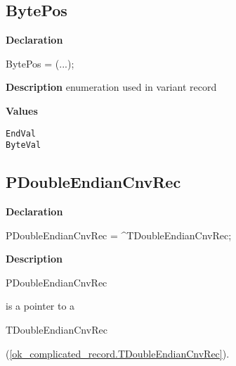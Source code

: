 \documentclass{report}
\begin{document}
\subsection*{BytePos}
\begin{list}{}{
\setlength{\itemindent}{0cm}
\setlength{\listparindent}{0cm}
\setlength{\leftmargin}{\evensidemargin}
\addtolength{\leftmargin}{\tmplength}
\settowidth{\labelsep}{X}
\addtolength{\leftmargin}{\labelsep}
\setlength{\labelwidth}{\tmplength}
}
\begin{flushleft}
\item[\textbf{Declaration}\hfill]
\begin{ttfamily}
BytePos = (...);\end{ttfamily}


\end{flushleft}
\par
\item[\textbf{Description}]
enumeration used in variant record\item[\textbf{Values}]
\begin{description}
\item[\texttt{EndVal}]  
\item[\texttt{ByteVal}]  
\end{description}


\end{list}
\subsection*{PDoubleEndianCnvRec}
\begin{list}{}{
\setlength{\itemindent}{0cm}
\setlength{\listparindent}{0cm}
\setlength{\leftmargin}{\evensidemargin}
\addtolength{\leftmargin}{\tmplength}
\settowidth{\labelsep}{X}
\addtolength{\leftmargin}{\labelsep}
\setlength{\labelwidth}{\tmplength}
}
\begin{flushleft}
\item[\textbf{Declaration}\hfill]
\begin{ttfamily}
PDoubleEndianCnvRec = {\^{}}TDoubleEndianCnvRec;\end{ttfamily}


\end{flushleft}
\par
\item[\textbf{Description}]
\begin{ttfamily}PDoubleEndianCnvRec\end{ttfamily} is a pointer to a \begin{ttfamily}TDoubleEndianCnvRec\end{ttfamily}(\ref{ok_complicated_record.TDoubleEndianCnvRec}).

\end{list}
\end{document}
